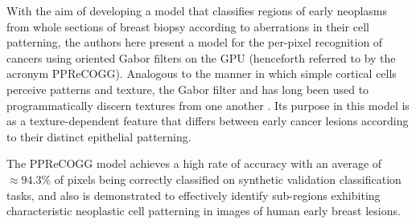 With the aim of developing a model that classifies regions of early neoplasms from whole sections of breast biopsy according to aberrations in their cell patterning, the authors here present a model for the per-pixel recognition of cancers
using oriented Gabor filters on the GPU (henceforth referred to by the acronym 
PPReCOGG). Analogous to the manner in which simple cortical cells perceive 
patterns and texture, the Gabor filter and has long been used to 
programmatically discern textures from one another 
\citep{fogel1989, marcelja1980}. Its purpose in this model is as a 
texture-dependent feature that differs between early cancer lesions according
to their distinct epithelial patterning.\par

The PPReCOGG model achieves a high rate of accuracy with an
average of $\approx94.3\%$ of pixels being correctly classified on synthetic 
validation classification tasks, and also is demonstrated to effectively identify sub-regions exhibiting characteristic neoplastic cell patterning in images of human early breast lesions.




